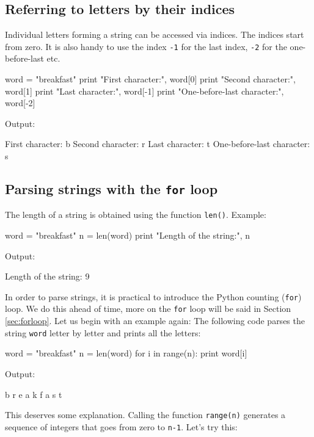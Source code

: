 \subsection{Referring to letters by their indices}\label{subsec:ind}

Individual letters forming a string can be accessed via indices. The indices 
start from zero. It is also handy to use the index {\tt -1} 
for the last index, {\tt -2} for the one-before-last etc.

\begin{bluecode}
word = "breakfast"
print "First character:", word[0]
print "Second character:", word[1]
print "Last character:", word[-1]
print "One-before-last character:", word[-2]
\end{bluecode}
Output:

\begin{greencode}
First character: b
Second character: r
Last character: t
One-before-last character: s
\end{greencode}

\subsection{Parsing strings with the {\tt for} loop}\label{subsec:forstr} 

The length of a string is obtained using the function {\tt len()}.
Example:

\begin{bluecode}
word = "breakfast"
n = len(word)
print "Length of the string:", n
\end{bluecode}
Output:

\begin{greencode}
Length of the string: 9
\end{greencode}
In order to parse strings, it is practical to introduce the Python counting 
({\tt for}) loop. We do this ahead of time, more on the {\tt for} loop will 
be said in Section \ref{sec:forloop}. Let us begin with an example again: The
following code parses the string {\tt word} letter by letter and prints all
the letters:

\begin{bluecode}
word = "breakfast"
n = len(word)
for i in range(n):
    print word[i]
\end{bluecode}
Output:

\begin{greencode}
b
r
e
a
k
f
a
s
t
\end{greencode}
This deserves some explanation. Calling the function {\tt range(n)} generates 
a sequence of integers that goes from zero to {\tt n-1}. Let's try this:

